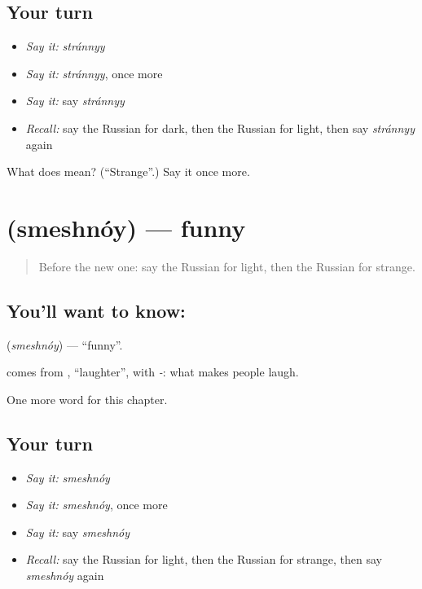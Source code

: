 \subsection*{Your turn}
\begin{itemize}
\raggedright
  \item \emph{Say it:} \emph{stránnyy}
  \item \emph{Say it:} \emph{stránnyy}, once more
  \item \emph{Say it:} say \emph{stránnyy}
  \item \emph{Recall:} say the Russian for dark, then the Russian for light, then say \emph{stránnyy} again
\end{itemize}

\begin{tcolorbox}[breakable,colback=teal!4,colframe=teal!35!black,title={Before you move on}]
What does  mean? (\textquotedblleft{}Strange\textquotedblright{}.) Say it once more.
\end{tcolorbox}
\section[\texorpdfstring{\ru{смешной} (smeshnóy)}{смешной (smeshnóy)}]{ (smeshnóy) — funny}

\label{lesson:RU-C245-smeshnoy}



\begin{quote}
Before the new one: say the Russian for light, then the Russian for strange.
\end{quote}

\subsection*{You'll want to know: }
\textbf{} (\emph{smeshnóy}) — \textquotedblleft{}funny\textquotedblright{}.

\begin{cousinweb}
\textbf{} comes from \emph{}, \textquotedblleft{}laughter\textquotedblright{}, with \emph{-}: what makes people laugh.
\end{cousinweb}

\begin{grammarlens}[title={What you've built}]
One more word for this chapter.
\end{grammarlens}

\subsection*{Your turn}
\begin{itemize}
\raggedright
  \item \emph{Say it:} \emph{smeshnóy}
  \item \emph{Say it:} \emph{smeshnóy}, once more
  \item \emph{Say it:} say \emph{smeshnóy}
  \item \emph{Recall:} say the Russian for light, then the Russian for strange, then say \emph{smeshnóy} again
\end{itemize}

